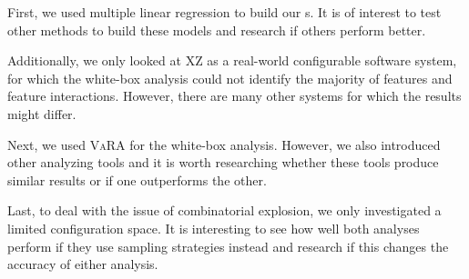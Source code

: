 First, we used multiple linear regression to build our {\perfInfluenceModel}s. 
It is of interest to test other methods to build these models and research if others perform better. 

Additionally, we only looked at \textsc{XZ} as a real-world configurable software system, 
for which the white-box analysis could not identify the majority of features and feature interactions. 
However, there are many other systems for which the results might differ.

Next, we used \textsc{VaRA} for the white-box analysis. 
However, we also introduced other analyzing tools and it is worth researching whether these tools produce similar results or if one outperforms the other.

Last, to deal with the issue of combinatorial explosion, we only investigated a limited configuration space. 
It is interesting to see how well both analyses perform if they use sampling strategies instead and 
research if this changes the accuracy of either analysis.